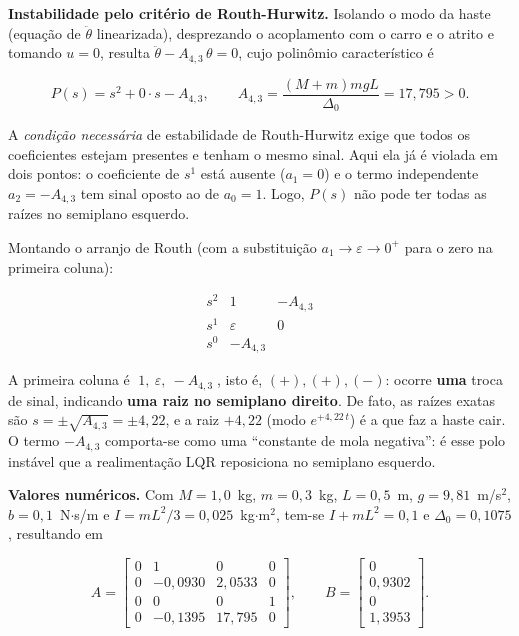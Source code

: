 \documentclass[brazil, 12pt]{article}
\begin{document}
\medskip

\noindent\textbf{Instabilidade pelo critério de Routh-Hurwitz.}
Isolando o modo da haste (equação de $\ddot{\theta}$ linearizada), desprezando o
acoplamento com o carro e o atrito e tomando $u=0$, resulta
$\ddot{\theta} - A_{4,3}\,\theta = 0$, cujo polinômio característico é

\[
P(s) = s^{2} + 0\cdot s - A_{4,3},
\qquad A_{4,3} = \frac{(M+m)mgL}{\Delta_0} = 17{,}795 > 0.
\]

A \emph{condição necessária} de estabilidade de Routh-Hurwitz exige que todos os
coeficientes estejam presentes e tenham o mesmo sinal. Aqui ela já é violada em
dois pontos: o coeficiente de $s^{1}$ está ausente ($a_1=0$) e o termo
independente $a_2 = -A_{4,3}$ tem sinal oposto ao de $a_0=1$. Logo, $P(s)$ não
pode ter todas as raízes no semiplano esquerdo.

Montando o arranjo de Routh (com a substituição $a_1 \to \varepsilon \to 0^{+}$
para o zero na primeira coluna):

\[
\begin{array}{c|cc}
s^{2} & 1 & -A_{4,3} \\[2pt]
s^{1} & \varepsilon & 0 \\[2pt]
s^{0} & -A_{4,3} &
\end{array}
\]

A primeira coluna é $\;1,\ \varepsilon,\ -A_{4,3}\;$, isto é, $(+),(+),(-)$:
ocorre \textbf{uma} troca de sinal, indicando \textbf{uma raiz no semiplano
direito}. De fato, as raízes exatas são $s = \pm\sqrt{A_{4,3}} = \pm 4{,}22$, e a
raiz $+4{,}22$ (modo $e^{+4{,}22\,t}$) é a que faz a haste cair. O termo
$-A_{4,3}$ comporta-se como uma ``constante de mola negativa'': é esse polo
instável que a realimentação LQR reposiciona no semiplano esquerdo.

\medskip

\noindent\textbf{Valores numéricos.} Com
$M=1{,}0$~kg, $m=0{,}3$~kg, $L=0{,}5$~m, $g=9{,}81$~m/s$^2$, $b=0{,}1$~N$\cdot$s/m
e $I=mL^{2}/3=0{,}025$~kg$\cdot$m$^2$, tem-se $I+mL^{2}=0{,}1$ e
$\Delta_0 = 0{,}1075$, resultando em

\[
A =
\begin{bmatrix}
0 & 1 & 0 & 0 \\
0 & -0{,}0930 & 2{,}0533 & 0 \\
0 & 0 & 0 & 1 \\
0 & -0{,}1395 & 17{,}795 & 0
\end{bmatrix},
\qquad
B =
\begin{bmatrix}
0 \\ 0{,}9302 \\ 0 \\ 1{,}3953
\end{bmatrix}.
\]
\end{document}
